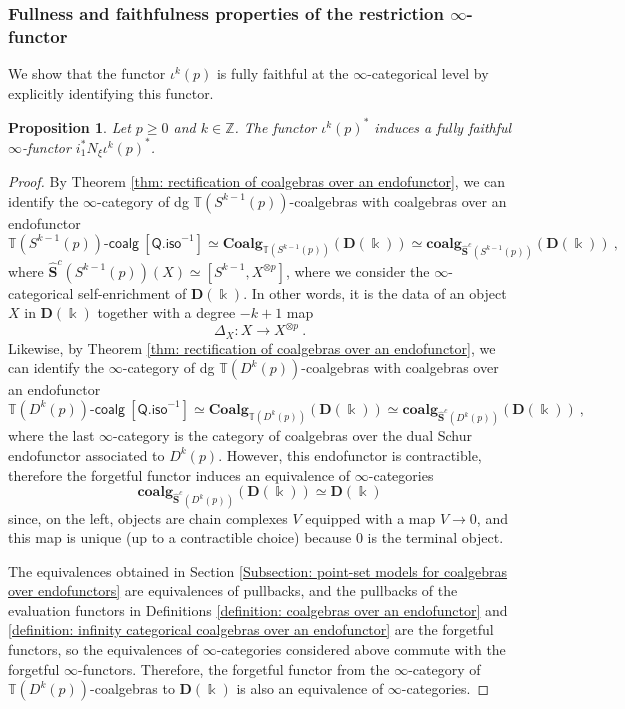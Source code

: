 \documentclass[a4paper,12pt]{amsart}
\theoremstyle{plain}
\newtheorem{proposition}[theorem]{Proposition}%
\theoremstyle{definition}
\theoremstyle{remark}
\newcommand{\kk}{\Bbbk}
\begin{document}
\subsubsection{Fullness and faithfulness properties of the restriction $\infty$-functor} We show that the functor $\iota^k(p)$ is fully faithful at the $\infty$-categorical level by explicitly identifying this functor. 

\begin{proposition}
Let $p \geq 0$ and $k \in \mathbb{Z}$. The functor $\iota^k(p)^*$ induces a fully faithful $\infty$-functor $i_1^*N_{\xi}\iota^k(p)^*$.
\end{proposition}

\begin{proof}
By Theorem \ref{thm: rectification of coalgebras over an endofunctor}, we can identify the $\infty$-category of dg $\mathbb{T}(S^{k-1}(p))$-coalgebras with coalgebras over an endofunctor\[
\mathbb{T}(S^{k-1}(p))\text{-}\mathsf{coalg}~[\mathsf{Q.iso}^{-1}] \simeq \mathbf{Coalg}_{\mathbb{T}(S^{k-1}(p))}(\mathbf{D}(\kk)) \simeq \mathbf{coalg}_{\widehat{\mathbf{S}}^c(S^{k-1}(p))}(\mathbf{D}(\kk))~,
\]
where $\widehat{\mathbf{S}}^c(S^{k-1}(p))(X) \simeq [S^{k-1}, X^{\otimes p}]$, where we consider the $\infty$-categorical self-enrichment of $\mathbf{D}(\kk)$. In other words, it is the data of an object $X$ in $\mathbf{D}(\kk)$ together with a degree $-k+1$ map 
\[
\Delta_X: X \longrightarrow X^{\otimes p}~. 
\]
Likewise, by Theorem \ref{thm: rectification of coalgebras over an endofunctor}, we can identify the $\infty$-category of dg $\mathbb{T}(D^{k}(p))$-coalgebras with coalgebras over an endofunctor
\[
\mathbb{T}(D^{k}(p))\text{-}\mathsf{coalg}~[\mathsf{Q.iso}^{-1}] \simeq \mathbf{Coalg}_{\mathbb{T}(D^{k}(p))}(\mathbf{D}(\kk)) \simeq \mathbf{coalg}_{\widehat{\mathbf{S}}^c(D^{k}(p))}(\mathbf{D}(\kk))~,
\]
where the last $\infty$-category is the category of coalgebras over the dual Schur endofunctor associated to $D^{k}(p)$. However, this endofunctor is contractible, therefore the forgetful functor induces an equivalence of $\infty$-categories 
\[
\mathbf{coalg}_{\widehat{\mathbf{S}}^c(D^{k}(p))}(\mathbf{D}(\kk)) \simeq \mathbf{D}(\kk)
\]
since, on the left, objects are chain complexes $V$ equipped with a map $V \longrightarrow 0$, and this map is unique (up to a contractible choice) because $0$ is the terminal object.

The equivalences obtained in Section \ref{Subsection: point-set models for coalgebras over endofunctors} are equivalences of pullbacks, and the pullbacks of the evaluation functors in Definitions \ref{definition: coalgebras over an endofunctor} and \ref{definition: infinity categorical coalgebras over an endofunctor} are the forgetful functors, so the equivalences of $\infty$-categories considered above commute with the forgetful $\infty$-functors. Therefore, the forgetful functor from the $\infty$-category of $\mathbb{T}(D^{k}(p))$-coalgebras to $\mathbf{D}(\kk)$ is also an equivalence of $\infty$-categories.


\end{proof}
\end{document}
